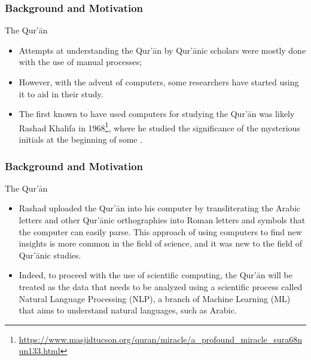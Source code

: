 \documentclass{beamer}
\theoremstyle{definition}
\begin{document}
\begin{frame}[t, fragile]\justifying
\frametitle{Background and Motivation}
\begin{block}{The Qur'\=an}
\begin{itemize}\justifying    
\item Attempts at understanding the Qur'\=an by Qur'\=anic scholars were mostly done with the use of manual processes;\pause
\item However, with the advent of computers, some researchers have started using it to aid in their study. \pause
\item The first known to have used computers for studying the Qur'\=an was likely Rashad Khalifa in 1968\footnote{\url{https://www.masjidtucson.org/quran/miracle/a_profound_miracle_sura68nun133.html}}, where he studied the significance of the mysterious initials at the beginning of some  .
\end{itemize}
\end{block}
\end{frame}

\begin{frame}[t, fragile]\justifying
\frametitle{Background and Motivation}
\begin{block}{The Qur'\=an}
\begin{itemize}\justifying        
\item Rashad uploaded the Qur'\=an into his computer by transliterating the Arabic letters and other Qur'\=anic orthographies into Roman letters and symbols that the computer can easily parse. This approach of using computers to find new insights is more common in the field of science, and it was new to the field of Qur'\=anic studies.\pause
\item Indeed, to proceed with the use of scientific computing, the Qur'\=an will be treated as the data that needs to be analyzed using a scientific process called Natural Language Processing (NLP), a branch of Machine Learning (ML) that aims to understand natural languages, such as Arabic.
\end{itemize}
\end{block}
\end{frame}
\end{document}
